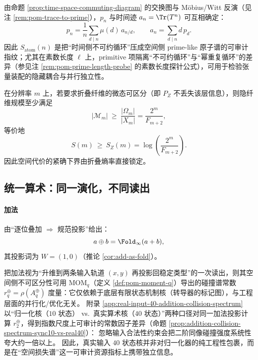 \begin{remark}\label{rem:pom-atom-audit}
由命题 \ref{prop:time-space-commuting-diagram} 的交换图与 Möbius/Witt 反演（见注 \ref{rem:pom-trace-to-prime}），$p_n$ 与时间迹 $a_n=\Tr(T^n)$ 可互相确定：
$$
p_n=\frac{1}{n}\sum_{d\mid n}\mu(d)\,a_{n/d},
\qquad
a_n=\sum_{d\mid n} d\,p_d.
$$
因此 $S_{\mathrm{atom}}(n)$ 是把“时间侧不可约循环”压成空间侧 prime-like 原子谱的可审计指纹；尤其在素数长度 $\ell$ 上，primitive 项隔离“不可约循环”与“幂重复循环”的差异（参见注 \ref{rem:pom-prime-length-probe} 的素数长度探针公式），可用于检验张量装配的隐藏耦合与并行独立性。
\end{remark}

\begin{corollary}[折叠诱导的空间下界]\label{cor:pom-space-lower-bound}
在分辨率 $m$ 上，若要求折叠纤维的微态可区分（即 $P_Z$ 不丢失该层信息），则隐纤维规模至少满足
\[
|\mathcal M_m|\ \ge\ \frac{|\Omega_m|}{|X_m|}=\frac{2^m}{F_{m+2}},
\]
等价地
\[
S(m)\ \ge\ S_Z(m)=\log\!\left(\frac{2^m}{F_{m+2}}\right).
\]
因此空间代价的紧确下界由折叠熵率直接锁定。
\end{corollary}

\subsection{统一算术：同一演化，不同读出}\label{subsec:pom-unified-arith}
\paragraph{加法}由“逐位叠加 $\Rightarrow$ 规范投影”给出：
\[
a\oplus b=\Fold_\infty(a+b),
\]
其投影词为 $W=(1,0)$（推论 \ref{cor:add-as-fold}）。

\begin{remark}\label{rem:addition-as-projection-collision-spectrum}
把加法视为“升维到两条输入轨道 \((x,y)\) 再投影回稳定类型”的一次读出，则其空间侧不可区分性可用
\(\mathrm{MOM}_q\)（定义 \ref{def:pom-moment-q}）导出的碰撞谱常数 \(r_q^{\oplus}=\rho(A_q^{\oplus})\) 度量：它仅依赖于底层有限状态机制核（转导器的标记图），与工程层面的并行化/优化无关。
附录 \ref{app:real-input-40-addition-collision-spectrum} 以“归一化核（$10$ 状态） vs.\ 真实算术核（$40$ 状态）”两种口径对同一加法投影计算 \(r_2^{\oplus}\)，得到指数尺度上可审计的常数因子差异（命题 \ref{prop:addition-collision-spectrum-sync10-vs-real40}）：
忽略输入合法性约束会把二阶同像碰撞强度系统性夸大约一倍以上。
因此，真实输入 $40$ 状态核并非对归一化器的纯工程性包裹，而是在“空间损失谱”这一可审计资源指标上携带独立信息。
\end{remark}

